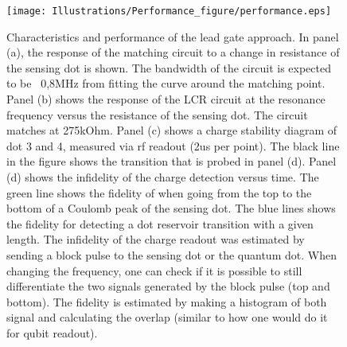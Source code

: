 \documentclass{article}
\begin{document}
\begin{figure}
	\texttt{[image: Illustrations/Performance\_figure/performance.eps]}
	\caption{Characteristics and performance of the lead gate approach. In panel (a), the response of the matching circuit to a change in resistance of the sensing dot is shown. The bandwidth of the circuit is expected to be ~0,8MHz from fitting the curve around the matching point.
	Panel (b) shows the response of the LCR circuit at the resonance frequency versus the resistance of the sensing dot. The circuit matches at 275kOhm.
	Panel (c) shows a charge stability diagram of dot 3 and 4, measured via rf readout (2us per point). The black line in the figure shows the transition that is probed in panel (d).
 	Panel (d) shows the infidelity of the charge detection versus time. The green line shows the fidelity of when going from the top to the bottom of a Coulomb peak of the sensing dot. The blue lines shows the fidelity for detecting a dot reservoir transition with a given length. The infidelity of the charge readout was estimated by sending a block pulse to the sensing dot or the quantum dot. When changing the frequency, one can check if it is possible to still differentiate the two signals generated by the block pulse (top and bottom). The fidelity is estimated by making a histogram of both signal and calculating the overlap (similar to how one would do it for qubit readout).
	}
	\label{fig:lead_gate_result}
\end{figure}
	
\end{document}
